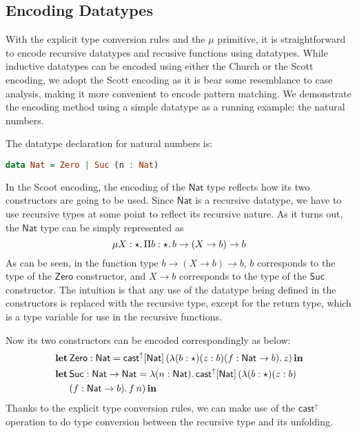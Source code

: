 \subsection{Encoding Datatypes}


\newcommand{\Nat}{\mathsf{Nat}} \newcommand{\zero}{\mathsf{Zero}}
\newcommand{\suc}{\mathsf{Suc}}
\newcommand{\List}{\mathsf{List}} \newcommand{\nil}{\mathsf{nil}}
\newcommand{\cons}{\mathsf{cons}}
\newcommand{\length}{\mathsf{length}}
\newcommand{\case}{\mathbf{case}} \newcommand{\of}{\mathbf{of}}
\newcommand{\data}{\mathbf{data}} \newcommand{\where}{\mathbf{where}}
\newcommand{\letbb}{\mathbf{let}} \newcommand{\inb}{\mathbf{in}}

With the explicit type conversion rules and the $\mu$ primitive, it is straightforward to encode recursive datatypes and recusive functions using datatypes. While inductive datatypes can be encoded using either the Church or the Scott encoding, we adopt the Scott encoding as it is bear some resemblance to case analysis, making it more convenient to encode pattern matching. We demonstrate the encoding method using a simple datatype as a running example: the natural numbers.

The datatype declaration for natural numbers is:
\begin{lstlisting}[language=Haskell]
  data Nat = Zero | Suc (n : Nat)
\end{lstlisting}
In the Scoot encoding, the encoding of the $\Nat$ type reflects how its two constructors are going to be used. Since $\Nat$ is a recursive datatype, we have to use recursive types at some point to reflect its recursive nature. As it turns out, the $\Nat$ type can be simply represented as
\[\mu X:\star.\,\Pi b:\star.\,b \rightarrow (X \rightarrow b) \rightarrow b\]
As can be seen, in the function type $b \rightarrow (X \rightarrow b) \rightarrow b$, $b$ corresponds to the type of the $\zero$ constructor, and $X \rightarrow b$ corresponds to the type of the $\suc$ constructor. The intuition is that any use of the datatype being defined in the constructors is replaced with the recursive type, except for the return type, which is a type variable for use in the recursive functions.

Now its two constructors can be encoded correspondingly as below:
\begin{align*}
  \letbb\,&\zero : \Nat = \fold{\Nat}{(\lambda (b : \star) (z : b) (f : \Nat \rightarrow b).\,z)}\,\inb \\
  \letbb\,&\suc : \Nat \rightarrow \Nat = \lambda (n : \Nat).\,\fold{\Nat}{(\lambda (b : \star) (z : b)\\ &(f : \Nat \rightarrow b).\,f\,n)}\,\inb
\end{align*}
Thanks to the explicit type conversion rules, we can make use of the $ \mathsf{cast}^{\uparrow} $ operation to do type conversion between the recursive type and its unfolding.

